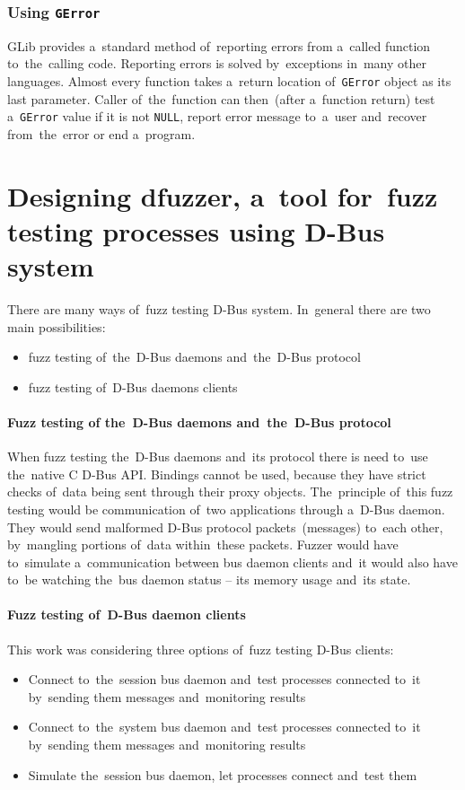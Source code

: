 \subsection{Using \texttt{GError}}
GLib provides a~standard method of~reporting errors from a~called function
to~the~calling code. Reporting errors is solved by~exceptions in~many other
languages. Almost every function takes a~return location of~\texttt{GError}
object as its last parameter. Caller of~the~function can then~(after a~function
return) test a~\texttt{GError} value if it is not \texttt{NULL}, report error
message to~a~user and~recover from~the~error or end a~program.



\chapter{Designing dfuzzer, a~tool for~fuzz testing processes using D-Bus system}
There are many ways of~fuzz testing D-Bus system. In~general there are two main
possibilities:
\begin{itemize}
	\item fuzz testing of~the~D-Bus daemons and~the~D-Bus protocol
	\item fuzz testing of~D-Bus daemons clients
\end{itemize}


\subsubsection{Fuzz testing of the~D-Bus daemons and~the~D-Bus protocol}
When fuzz testing the~D-Bus daemons and~its protocol there is need to~use the~native
C \mbox{D-Bus} API. Bindings cannot be used, because they have strict checks
of~data being sent through their proxy objects. The~principle of~this
fuzz testing would be communication of~two applications through a~D-Bus daemon.
They would send malformed D-Bus protocol packets~(messages) to~each other,
by~mangling portions of~data within~these packets. Fuzzer would have to~simulate
a~communication between bus daemon clients and~it would also have to~be
watching the~bus daemon status -- its memory usage and~its state.


\subsubsection{Fuzz testing of~D-Bus daemon clients}
This work was considering three options of~fuzz testing D-Bus clients:
\begin{itemize}
	\item Connect to~the~session bus daemon and~test processes connected to~it
		by~sending them messages and~monitoring results
	\item Connect to~the~system bus daemon and~test processes connected to~it
		by~sending them	messages and~monitoring results
	\item Simulate the~session bus daemon, let processes connect and~test them
\end{itemize}

